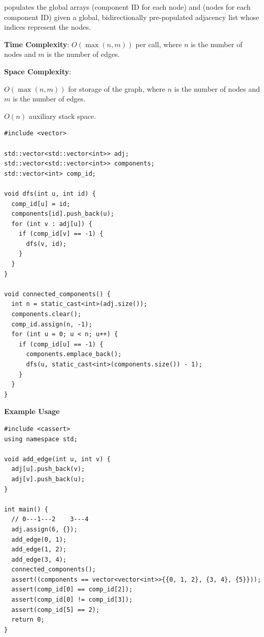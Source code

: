 \begin{compactitem}
  \item {} populates the global arrays  (component ID for each node) and  (nodes for each component ID) given a global, bidirectionally pre-populated adjacency list  whose indices represent the nodes.
\end{compactitem}

\textbf{Time Complexity}: $O(\max\left(n, m\right))$ per call, where $n$ is the number of nodes and $m$ is the number of edges.

\textbf{Space Complexity}:
\begin{compactitem}
  \item $O(\max\left(n, m\right))$ for storage of the graph, where $n$ is the number of nodes and $m$ is the number of edges.
  \item $O(n)$ auxiliary stack space.
\end{compactitem}

\begin{lstlisting}[style=cpp]
#include <vector>

std::vector<std::vector<int>> adj;
std::vector<std::vector<int>> components;
std::vector<int> comp_id;

void dfs(int u, int id) {
  comp_id[u] = id;
  components[id].push_back(u);
  for (int v : adj[u]) {
    if (comp_id[v] == -1) {
      dfs(v, id);
    }
  }
}

void connected_components() {
  int n = static_cast<int>(adj.size());
  components.clear();
  comp_id.assign(n, -1);
  for (int u = 0; u < n; u++) {
    if (comp_id[u] == -1) {
      components.emplace_back();
      dfs(u, static_cast<int>(components.size()) - 1);
    }
  }
}
\end{lstlisting}
\textbf{Example Usage}\par
\begin{lstlisting}[style=cpp]
#include <cassert>
using namespace std;

void add_edge(int u, int v) {
  adj[u].push_back(v);
  adj[v].push_back(u);
}

int main() {
  // 0---1---2    3---4
  adj.assign(6, {});
  add_edge(0, 1);
  add_edge(1, 2);
  add_edge(3, 4);
  connected_components();
  assert((components == vector<vector<int>>{{0, 1, 2}, {3, 4}, {5}}));
  assert(comp_id[0] == comp_id[2]);
  assert(comp_id[0] != comp_id[3]);
  assert(comp_id[5] == 2);
  return 0;
}
\end{lstlisting}
